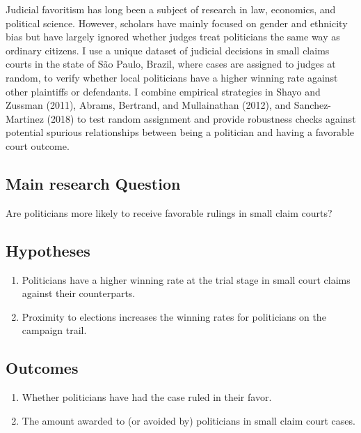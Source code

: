 \documentclass[]{article}
\begin{document}
Judicial favoritism has long been a subject of research in law,
economics, and political science. However, scholars have mainly focused
on gender and ethnicity bias but have largely ignored whether judges
treat politicians the same way as ordinary citizens. I use a unique
dataset of judicial decisions in small claims courts in the state of São
Paulo, Brazil, where cases are assigned to judges at random, to verify
whether local politicians have a higher winning rate against other
plaintiffs or defendants. I combine empirical strategies in Shayo and
Zussman (2011), Abrams, Bertrand, and Mullainathan (2012), and
Sanchez-Martinez (2018) to test random assignment and provide robustness
checks against potential spurious relationships between being a
politician and having a favorable court outcome.

\hypertarget{main-research-question-1}{%
\subsection{Main research Question}\label{main-research-question-1}}

Are politicians more likely to receive favorable rulings in small claim
courts?

\hypertarget{hypotheses-1}{%
\subsection{Hypotheses}\label{hypotheses-1}}

\begin{enumerate}
\item
  Politicians have a higher winning rate at the trial stage in small
  court claims against their counterparts.
\item
  Proximity to elections increases the winning rates for politicians on
  the campaign trail.
\end{enumerate}

\hypertarget{outcomes-1}{%
\subsection{Outcomes}\label{outcomes-1}}

\begin{enumerate}
\item
  Whether politicians have had the case ruled in their favor.
\item
  The amount awarded to (or avoided by) politicians in small claim court
  cases.
\end{enumerate}
\end{document}
